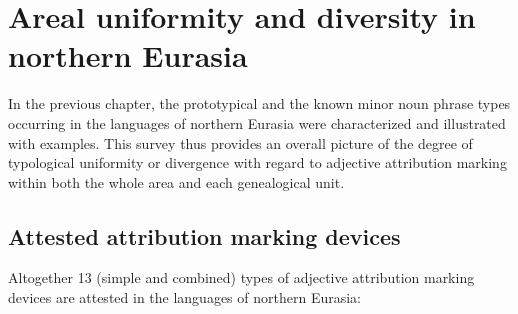 
\chapter[Areal uniformity and diversity]{Areal uniformity and diversity in northern Eurasia}\label{areality}
In the previous chapter, the prototypical and the known minor noun phrase types occurring in the languages of northern Eurasia were characterized and illustrated with examples. This survey thus provides an overall picture of the degree of typological uniformity or divergence with regard to adjective attribution marking within both the whole area and each genealogical unit.

\section{Attested attribution marking devices}
Altogether 13 (simple and combined) types of adjective attribution marking devices are attested in the languages of northern Eurasia:
